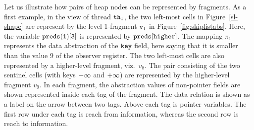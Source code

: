 Let us illustrate how pairs of heap nodes can be represented by fragments.
As a first example, in the view of thread ${\tt th}_1$, the two left-most cells
in Figure~\ref{sl-shape} are represent by the level 1-fragment $\mathtt{v}_1$ in
Figure~\ref{fig:skiplistabs}. Here, the variable $\tt preds(1)[3]$ is represented by $\tt preds[higher]$. The mapping $\pi_1$ represents the data abstraction of
the $\tt key$ field, here saying that it is smaller than the value $9$ of the
observer register.
The two left-most cells are also represented by
a higher-level fragment, viz.\ $v_8$.
The pair consisting of the two sentinel cells (with keys $\tt -\infty$ and $\tt +\infty$) are represented by the higher-level fragment $v_9$. In each fragment, the abstraction values of non-pointer fields are shown represented inside each tag of the fragment. The data relation is shown as a label on the  arrow between two tags. Above each tag is pointer variables. The first row under each tag is reach from information, whereas the second row is reach to information.
 

